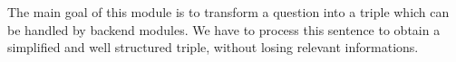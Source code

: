 The main goal of this module is to transform a question into a triple which can
be handled by backend modules. We have to process this sentence to obtain a simplified
and well structured triple, without losing relevant informations.

